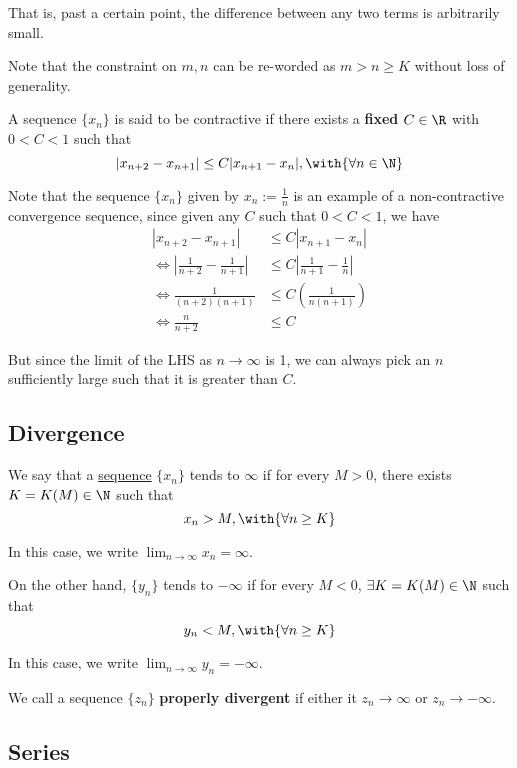 That is, past a certain point, the difference between any two terms is
arbitrarily small.

Note that the constraint on $m,n$ can be re-worded as $m>n\geq K$ without loss
of generality.

\label{d5c8fb8}

A sequence $\{x_n\}$ is said to be contractive if there exists a \textbf{fixed}
$C\in\R$ with $0<C<1$ such that
$$
  |x_{n+2}-x_{n+1}|\leq C|x_{n+1}-x_n|,\with{\forall n\in\N}
$$

Note that the sequence $\{x_n\}$ given by $x_n:=\frac1n$ is an example of a
non-contractive convergence sequence, since given any $C$ such that $0<C<1$, we
have
\begin{align*}
  |x_{n+2}-x_{n+1}|                        &\leq C|x_{n+1}-x_n|                    \\
  \iff\left|\frac1{n+2}-\frac1{n+1}\right| &\leq C\left|\frac1{n+1}-\frac1n\right| \\
  \iff\frac1{(n+2)(n+1)}                   &\leq C\left(\frac1{n(n+1)}\right)      \\
  \iff\frac{n}{n+2}                        &\leq C
\end{align*}

But since the limit of the LHS as $n\to\infty$ is 1, we can always pick an $n$
sufficiently large such that it is greater than $C$.

\subsection{Divergence}\label{e1fcd30}

\label{eb71424}

We say that a \href{b5fa0e4}{sequence} $\{x_n\}$ tends to $\infty$ if for every
$M>0$, there exists $K=K(M)\in\N$ such that
$$
  x_n>M,\with{\forall n\geq K}
$$

In this case, we write $\displaystyle\lim_{n\to\infty}x_n=\infty$.

On the other hand, $\{y_n\}$ tends to $-\infty$ if for every $M<0$, $\exists
K=K(M)\in\N$ such that
$$
  y_n<M,\with{\forall n\geq K}
$$

In this case, we write $\displaystyle\lim_{n\to\infty}y_n=-\infty$.

We call a sequence $\{z_n\}$ \textbf{properly divergent} if either it
$z_n\to\infty$ or $z_n\to-\infty$.

\subsection{Series}\label{f9277e5}

